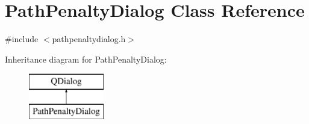 \hypertarget{class_path_penalty_dialog}{}\section{Path\+Penalty\+Dialog Class Reference}
\label{class_path_penalty_dialog}


{\ttfamily \#include $<$pathpenaltydialog.\+h$>$}

Inheritance diagram for Path\+Penalty\+Dialog\+:\begin{figure}[H]
\begin{center}
\leavevmode
\includegraphics[height=2.000000cm]{de/dcf/class_path_penalty_dialog}
\end{center}
\end{figure}
